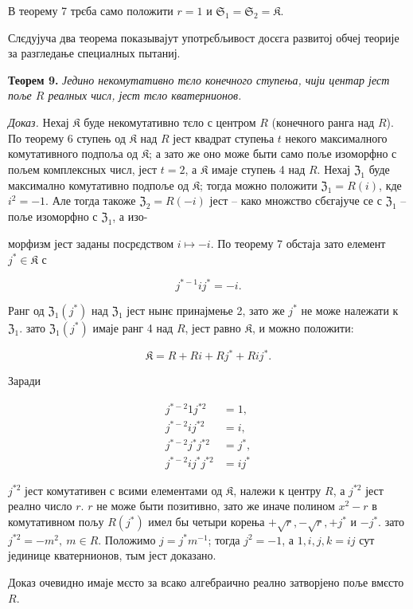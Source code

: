 \documentclass[11pt]{article}
\begin{document}
В теорему 7 трєба само положити \(r=1\) и \(\mathfrak S_1=\mathfrak S_2=\mathfrak K\).

Слєдујуча два теорема показывајут употрєбљивост досєга развитој обчеј теорије за разгледање специалных пытаниј.

\textbf{Теорем 9.} \emph{Једино некомутативно тєло конечного ступења, чији центар јест поље \(R\) реалных числ, јест тєло кватернионов.}

\emph{Доказ.} Нехај \(\mathfrak K\) буде некомутативно тєло с центром \(R\) (конечного ранга над \(R\)). По теорему 6 ступењ од \(\mathfrak K\) над \(R\) јест квадрат ступења \(t\) некого максималного комутативного подпоља од \(\mathfrak K\); а зато же оно може быти само поље изоморфно с пољем комплексных числ, јест \(t=2\), а \(\mathfrak K\) имаје ступењ 4 над \(R\). Нехај \(\mathfrak Z_1\) буде максимално комутативно подпоље од \(\mathfrak K\); тогда можно положити \(\mathfrak Z_1=R(i)\), кде \(i^2=-1\). Але тогда такоже \(\mathfrak Z_2=R(-i)\) јест -- како множство сбєгајуче се с \(\mathfrak Z_1\) -- поље изоморфно с \(\mathfrak Z_1\), а изо-

морфизм јест заданы посрєдством \(i\mapsto -i\). По теорему 7 обстаја зато елемент \(j^*\in\mathfrak K\) с

\[
j^{*-1}ij^*=-i.
\]

Ранг од \(\mathfrak Z_1(j^*)\) над \(\mathfrak Z_1\) јест нынє принајмење 2, зато же \(j^*\) не може належати к \(\mathfrak Z_1\). зато \(\mathfrak Z_1(j^*)\) имаје ранг 4 над \(R\), јест равно \(\mathfrak K\), и можно положити:

\[
\mathfrak K=R+Ri+Rj^*+Rij^*.
\]

Заради

\[
\begin{aligned}
j^{*-2}1j^{*2}&=1,\\
j^{*-2}ij^{*2}&=i,\\
j^{*-2}j^*j^{*2}&=j^*,\\
j^{*-2}ij^*j^{*2}&=ij^*
\end{aligned}
\]

\(j^{*2}\) јест комутативен с всими елементами од \(\mathfrak K\), належи к центру \(R\), а \(j^{*2}\) јест реално число \(r\). \(r\) не може быти позитивно, зато же иначе полином \(x^2-r\) в комутативном пољу \(R(j^*)\) имел бы четыри корења \(+\sqrt r,-\sqrt r,+j^*\) и \(-j^*\). зато \(j^{*2}=-m^2,\ m\in R\). Положимо \(j=j^*m^{-1}\); тогда \(j^2=-1\), а \(1,i,j,k=ij\) сут јединице кватернионов, тым јест доказано.

Доказ очевидно имаје мєсто за всако алгебраично реално затворјено поље вмєсто \(R\).
\end{document}
